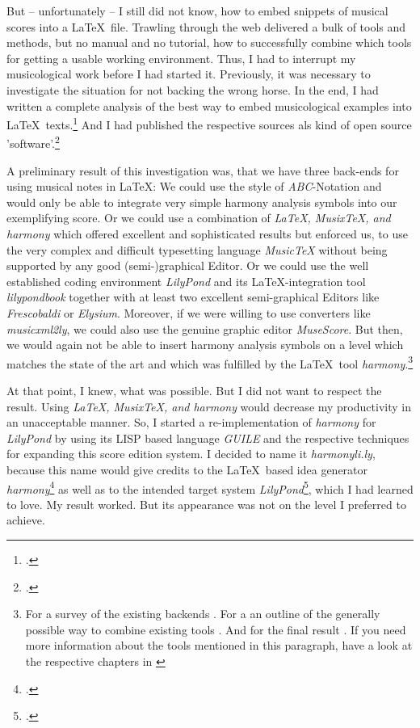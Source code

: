 \documentclass[
  DIV=calc,
  BCOR=5mm,
  12pt,
  headings=small,
  oneside,
  abstract=true,
  toc=bib,
  xcolor=dvipsnames,
  openany,
  english]{scrartcl}
\newcommand{\acc}[0]{\textit}
\begin{document}
But -- unfortunately -- I still did not know, how to embed snippets of musical
scores into a \LaTeX\ file. Trawling through the web delivered a bulk of tools
and methods, but no manual and no tutorial, how to successfully combine which
tools for getting a usable working environment. Thus, I had to interrupt my
musicological work before I had started it. Previously, it was necessary to
investigate the situation for not backing the wrong horse. In the end, I had
written a complete analysis of the best way to embed musicological examples
into \LaTeX\ texts.\footcite[cf.][\nopage]{reincke2019c} And I had published the
respective sources als kind of open source
'software'.\footcite[cf.][\nopage]{reincke2019a}

A preliminary result of this investigation was, that we have three back-ends for
using musical notes in \LaTeX: We could use the style of \acc{ABC}-Notation and
would only be able to integrate very simple harmony analysis symbols into our
exemplifying score. Or we could use a combination of \acc{\LaTeX, Musix\TeX, and
harmony} which offered excellent and sophisticated results but enforced us, to
use the very complex and difficult typesetting language \acc{MusicTeX} without
being supported by any good (semi-)graphical Editor. Or we could use the well
established coding environment \acc{LilyPond} and its \LaTeX-integration tool
\acc{lilypondbook} together with at least two excellent semi-graphical Editors
like \acc{Frescobaldi} or \acc{Elysium}. Moreover, if we were willing to use
converters like \acc{music\-xml2ly}, we could also use the genuine graphic editor
\acc{MuseScore}. But then, we would again not be able to insert harmony
analysis symbols on a level which matches the state of the art and which was
fulfilled by the \LaTeX\ tool \acc{harmony}.\footnote{For a survey of the
existing backends \cite[cf.][19ff]{reincke2019c}. For a an outline of the
generally possible way to combine existing tools \cite[cf.][91f]{reincke2019c}.
And for the final result \cite[cf.][100f]{reincke2019c}. If you need more
information about the tools mentioned in this paragraph, have a look at the
respective chapters in \cite[cf.][\nopage et passim]{reincke2019c}}

At that point, I knew, what was possible. But I did not want to respect the
result. Using \acc{\LaTeX, Musix\TeX, and harmony} would decrease my
productivity in an unacceptable manner. So, I started a re-implementation of
\acc{harmony} for \acc{LilyPond} by using its LISP based language \acc{GUILE}
and the respective techniques for expanding this score edition system. I decided
to name it \acc{harmonyli.ly}, because this name would give credits to the
\LaTeX\ based idea generator \acc{harmony}\footcite[cf.][\nopage]{WegWeg2007a}
as well as to the intended target system \acc{LilyPond}\footcite[cf.][\nopage
wp]{LilyPond2018a}, which I had learned to love. My result worked. But its
appearance was not on the level I preferred to achieve.
\end{document}
